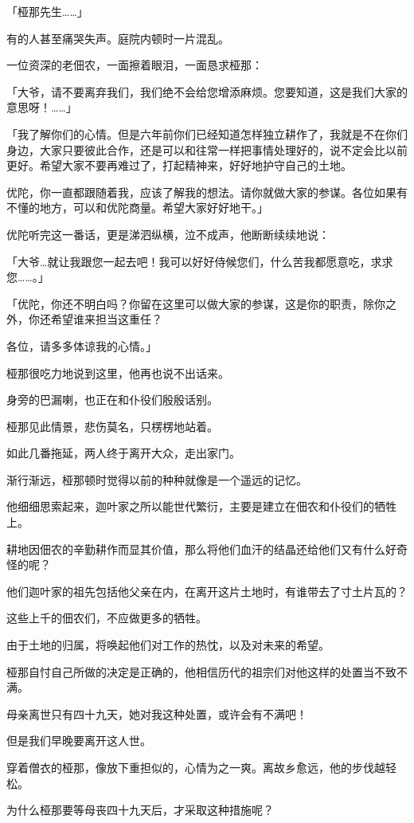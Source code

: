 \documentclass[twoside,openany]{book}
\begin{document}
「桠那先生……」

有的人甚至痛哭失声。庭院内顿时一片混乱。

一位资深的老佃农，一面擦着眼泪，一面恳求桠那：

「大爷，请不要离弃我们，我们绝不会给您增添麻烦。您要知道，这是我们大家的意思呀！……」

「我了解你们的心情。但是六年前你们已经知道怎样独立耕作了，我就是不在你们身边，大家只要彼此合作，还是可以和往常一样把事情处理好的，说不定会比以前更好。希望大家不要再难过了，打起精神来，好好地护守自己的土地。

优陀，你一直都跟随着我，应该了解我的想法。请你就做大家的参谋。各位如果有不懂的地方，可以和优陀商量。希望大家好好地干。」

优陀听完这一番话，更是涕泗纵横，泣不成声，他断断续续地说：

「大爷…就让我跟您一起去吧！我可以好好侍候您们，什么苦我都愿意吃，求求您……。」

「优陀，你还不明白吗？你留在这里可以做大家的参谋，这是你的职责，除你之外，你还希望谁来担当这重任？

各位，请多多体谅我的心情。」

桠那很吃力地说到这里，他再也说不出话来。

身旁的巴漏喇，也正在和仆役们殷殷话别。

桠那见此情景，悲伤莫名，只楞楞地站着。

如此几番拖延，两人终于离开大众，走出家门。

渐行渐远，桠那顿时觉得以前的种种就像是一个遥远的记忆。

他细细思索起来，迦叶家之所以能世代繁衍，主要是建立在佃农和仆役们的牺牲上。

耕地因佃农的辛勤耕作而显其价值，那么将他们血汗的结晶还给他们又有什么好奇怪的呢？

他们迦叶家的祖先包括他父亲在内，在离开这片土地时，有谁带去了寸土片瓦的？

这些上千的佃农们，不应做更多的牺牲。

由于土地的归属，将唤起他们对工作的热忱，以及对未来的希望。

桠那自忖自己所做的决定是正确的，他相信历代的祖宗们对他这样的处置当不致不满。

母亲离世只有四十九天，她对我这种处置，或许会有不满吧！

但是我们早晚要离开这人世。

穿着僧衣的桠那，像放下重担似的，心情为之一爽。离故乡愈远，他的步伐越轻松。

为什么桠那要等母丧四十九天后，才采取这种措施呢？
\end{document}
